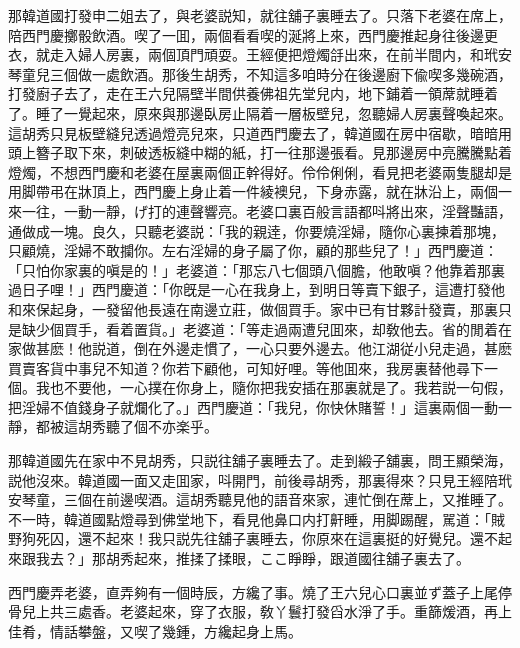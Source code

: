 那韓道國打發申二姐去了，與老婆説知，就往舖子裏睡去了。只落下老婆在席上，陪西門慶擲骰飲酒。喫了一囬，兩個看看喫的涎將上來，西門慶推起身往後邊更衣，就走入婦人房裏，兩個頂門頑耍。王經便把燈燭㧱出來，在前半間内，和玳安琴童兒三個做一處飲酒。那後生胡秀，不知這多咱時分在後邊廚下偸喫多幾碗酒，打發廚子去了，走在王六兒隔壁半間供養佛祖先堂兒内，地下鋪着一領蓆就睡着了。睡了一覺起來，原來與那邊臥房止隔着一層板壁兒，忽聽婦人房裏聲喚起來。這胡秀只見板壁縫兒透過燈亮兒來，只道西門慶去了，韓道國在房中宿歇，暗暗用頭上簪子取下來，刺破透板縫中糊的紙，打一往那邊張看。見那邊房中亮騰騰點着燈燭，不想西門慶和老婆在屋裏兩個正幹得好。伶伶俐俐，看見把老婆兩隻腿却是用脚帶弔在牀頂上，西門慶上身止着一件綾襖兒，下身赤露，就在牀沿上，兩個一來一往，一動一靜，げ打的連聲響亮。老婆口裏百般言語都呌將出來，淫聲豔語，通做成一塊。良久，只聽老婆説：「我的親逹，你要燒淫婦，隨你心裏揀着那塊，只顧燒，淫婦不敢攔你。左右淫婦的身子屬了你，顧的那些兒了！」西門慶道：「只怕你家裏的嗔是的！」老婆道：「那忘八七個頭八個膽，他敢嗔？他靠着那裏過日子哩！」西門慶道：「你旣是一心在我身上，到明日等賣下銀子，這遭打發他和來保起身，一發留他長遠在南邊立莊，做個買手。家中已有甘夥計發賣，那裏只是缺少個買手，看着置貨。」老婆道：「等走過兩遭兒囬來，却敎他去。省的閒着在家做甚麽！他説道，倒在外邊走慣了，一心只要外邊去。他江湖従小兒走過，甚麽買賣客貨中事兒不知道？你若下顧他，可知好哩。等他囬來，我房裏替他尋下一個。我也不要他，一心撲在你身上，隨你把我安插在那裏就是了。我若説一句假，把淫婦不值錢身子就爛化了。」西門慶道：「我兒，你快休賭誓！」這裏兩個一動一靜，都被這胡秀聽了個不亦楽乎。

那韓道國先在家中不見胡秀，只説往舖子裏睡去了。走到緞子舖裏，問王顯榮海，説他沒來。韓道國一面又走囬家，呌開門，前後尋胡秀，那裏得來？只見王經陪玳安琴童，三個在前邊喫酒。這胡秀聽見他的語音來家，連忙倒在蓆上，又推睡了。不一時，韓道國點燈尋到佛堂地下，看見他鼻口内打鼾睡，用脚踢醒，駡道：「賊野狗死囚，還不起來！我只説先往舖子裏睡去，你原來在這裏挺的好覺兒。還不起來跟我去？」那胡秀起來，推揉了揉眼，ここ睜睜，跟道國往舖子裏去了。

西門慶弄老婆，直弄夠有一個時辰，方纔了事。燒了王六兒心口裏並ず蓋子上尾停骨兒上共三處香。老婆起來，穿了衣服，敎丫鬟打發舀水淨了手。重篩煖酒，再上佳肴，情話攀盤，又喫了幾鍾，方纔起身上馬。

